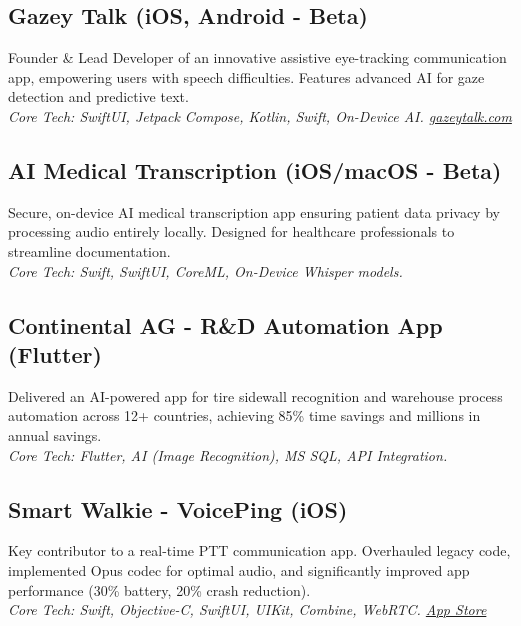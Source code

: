 \documentclass[10pt,letterpaper]{article} %
\begin{document}
\subsection*{Gazey Talk (iOS, Android - Beta)}
\noindent Founder & Lead Developer of an innovative assistive eye-tracking communication app, empowering users with speech difficulties. Features advanced AI for gaze detection and predictive text. \\
\textit{Core Tech: SwiftUI, Jetpack Compose, Kotlin, Swift, On-Device AI. \textbullet{} \href{https://gazeytalk.com/}{gazeytalk.com}}
\vspace{0.5ex}

\subsection*{AI Medical Transcription (iOS/macOS - Beta)}
\noindent Secure, on-device AI medical transcription app ensuring patient data privacy by processing audio entirely locally. Designed for healthcare professionals to streamline documentation. \\
\textit{Core Tech: Swift, SwiftUI, CoreML, On-Device Whisper models.}
\vspace{0.5ex}

\subsection*{Continental AG - R&D Automation App (Flutter)}
\noindent Delivered an AI-powered app for tire sidewall recognition and warehouse process automation across 12+ countries, achieving 85\% time savings and millions in annual savings. \\
\textit{Core Tech: Flutter, AI (Image Recognition), MS SQL, API Integration.}
\vspace{0.5ex}

\subsection*{Smart Walkie - VoicePing (iOS)}
\noindent Key contributor to a real-time PTT communication app. Overhauled legacy code, implemented Opus codec for optimal audio, and significantly improved app performance (30\% battery, 20\% crash reduction). \\
\textit{Core Tech: Swift, Objective-C, SwiftUI, UIKit, Combine, WebRTC. \textbullet{} \href{https://apps.apple.com/my/app/voiceping/id1249953303}{App Store}}
\vspace{1ex}
\end{document}

